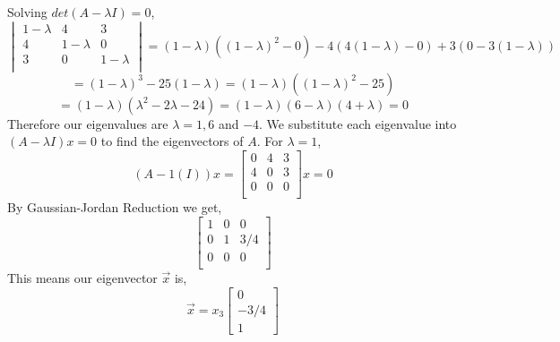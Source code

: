 {{Solving $det(A-\lambda I) = 0$,
\[\begin{vmatrix} 1 - \lambda & 4 & 3 \\ 4 & 1 -\lambda & 0 \\ 3 & 0 & 1 -\lambda \\ \end{vmatrix} = (1 - \lambda)((1-\lambda)^2-0)-4(4(1-\lambda)-0)+3(0-3(1-\lambda))\]
\[ = (1-\lambda)^3 - 25(1-\lambda) = (1-\lambda)((1-\lambda)^2 - 25) \]
\[= (1-\lambda)(\lambda^2-2\lambda -24) = (1 - \lambda)(6-\lambda)(4+\lambda) = 0 \]
Therefore our eigenvalues are $\lambda = 1, 6$ and $-4$.
We substitute each eigenvalue into $(A-\lambda I)x = 0$ to find the eigenvectors of $A$.
For $\lambda = 1$,
\[(A-1(I))x = \begin{bmatrix} 0 & 4 & 3 \\ 4 & 0 & 3 \\ 0 & 0 & 0 \\ \end{bmatrix}x = 0 \]
By Gaussian-Jordan Reduction we get, 
\[\begin{bmatrix} 1 & 0 & 0 \\ 0 & 1 & 3/4 \\ 0 & 0 & 0 \\ \end{bmatrix} \]
This means our eigenvector $\vec{x}$ is, 
\[\vec{x} = x_3\begin{bmatrix} 0 \\ -3/4 \\ 1 \end{bmatrix}\]
}
}
